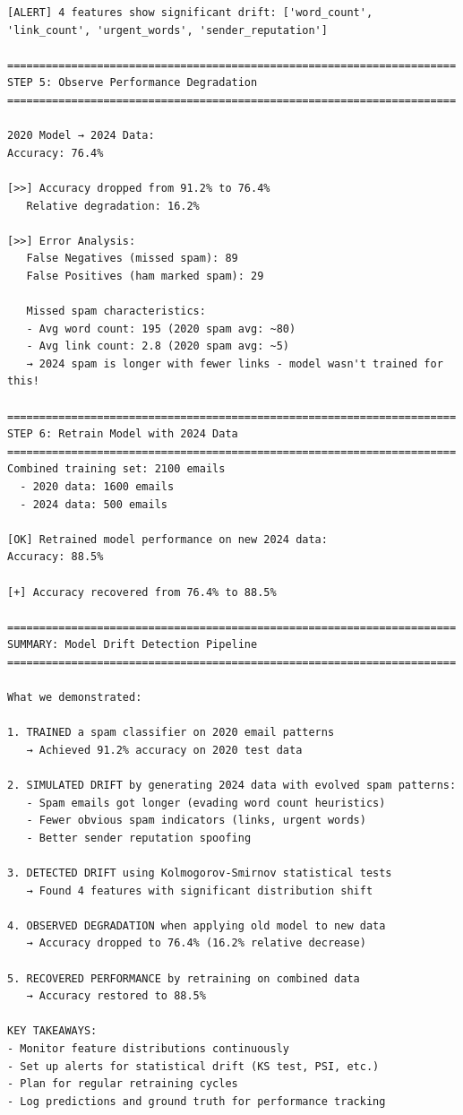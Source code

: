 \documentclass[11pt,oneside]{book}
\begin{document}
\begin{lstlisting}
[ALERT] 4 features show significant drift: ['word_count', 'link_count', 'urgent_words', 'sender_reputation']

======================================================================
STEP 5: Observe Performance Degradation
======================================================================

2020 Model → 2024 Data:
Accuracy: 76.4%

[>>] Accuracy dropped from 91.2% to 76.4%
   Relative degradation: 16.2%

[>>] Error Analysis:
   False Negatives (missed spam): 89
   False Positives (ham marked spam): 29

   Missed spam characteristics:
   - Avg word count: 195 (2020 spam avg: ~80)
   - Avg link count: 2.8 (2020 spam avg: ~5)
   → 2024 spam is longer with fewer links - model wasn't trained for this!

======================================================================
STEP 6: Retrain Model with 2024 Data
======================================================================
Combined training set: 2100 emails
  - 2020 data: 1600 emails
  - 2024 data: 500 emails

[OK] Retrained model performance on new 2024 data:
Accuracy: 88.5%

[+] Accuracy recovered from 76.4% to 88.5%

======================================================================
SUMMARY: Model Drift Detection Pipeline
======================================================================

What we demonstrated:

1. TRAINED a spam classifier on 2020 email patterns
   → Achieved 91.2% accuracy on 2020 test data

2. SIMULATED DRIFT by generating 2024 data with evolved spam patterns:
   - Spam emails got longer (evading word count heuristics)
   - Fewer obvious spam indicators (links, urgent words)
   - Better sender reputation spoofing

3. DETECTED DRIFT using Kolmogorov-Smirnov statistical tests
   → Found 4 features with significant distribution shift

4. OBSERVED DEGRADATION when applying old model to new data
   → Accuracy dropped to 76.4% (16.2% relative decrease)

5. RECOVERED PERFORMANCE by retraining on combined data
   → Accuracy restored to 88.5%

KEY TAKEAWAYS:
- Monitor feature distributions continuously
- Set up alerts for statistical drift (KS test, PSI, etc.)
- Plan for regular retraining cycles
- Log predictions and ground truth for performance tracking
\end{lstlisting}
\end{document}
